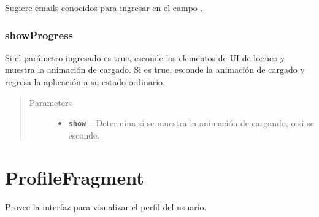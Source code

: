 \documentclass[letterpaper,10pt,english]{sphinxmanual}
\begin{document}
\begin{fulllineitems}
\label{Fragments/SignUpFragment:com.fiuba.tallerii.jobify.SignUpFragment.populateAutoComplete()}
Sugiere emails conocidos para ingresar en el campo .

\end{fulllineitems}



\subsubsection{showProgress}
\label{Fragments/SignUpFragment:showprogress}

\begin{fulllineitems}
\label{Fragments/SignUpFragment:com.fiuba.tallerii.jobify.SignUpFragment.showProgress(boolean)}
Si el parámetro ingresado es true, esconde los elementos de UI de logueo y muestra la animación de cargado. Si es true, esconde la animación de cargado y regresa la aplicación a su estado ordinario.
\begin{quote}\begin{description}
\item[{Parameters}] \leavevmode\begin{itemize}
\item {} 
\textbf{\texttt{show}} -- Determina si se muestra la animación de cargando, o si se esconde.

\end{itemize}

\end{description}\end{quote}

\end{fulllineitems}



\section{ProfileFragment}
\label{Fragments/ProfileFragment:profilefragment}\label{Fragments/ProfileFragment::doc}

\begin{fulllineitems}
\label{Fragments/ProfileFragment:com.fiuba.tallerii.jobify.ProfileFragment}
Provee la interfaz para visualizar el perfil del usuario.

\end{fulllineitems}
\end{document}

